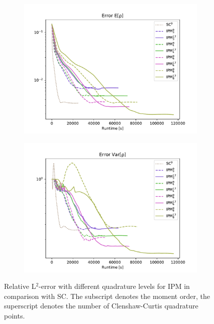 \begin{figure}[h!]
\centering
\centering
	\begin{subfigure}{0.5\linewidth}
		\centering
				\includegraphics[width=\linewidth]{figs/StudyQuadrature/L2_error_E[rho]_new.pdf}
		\caption{}
		\label{fig:ErrorDifferentQuadA}
	\end{subfigure}%
	\begin{subfigure}{0.5\linewidth}
		\centering
				\includegraphics[width=\linewidth]{figs/StudyQuadrature/L2_error_Var[rho]_new.pdf}
		\caption{}
		\label{fig:ErrorDifferentQuadB}
	\end{subfigure}
	\caption{Relative L$^2$-error with different quadrature levels for IPM in comparison with SC. The subscript denotes the moment order, the superscript denotes the number of Clenshaw-Curtis quadrature points.}
	\label{fig:ErrorDifferentQuad}
\end{figure}
